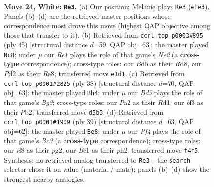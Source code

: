 \documentclass[11pt]{article}
\begin{document}
\clearpage

\begin{figure}[p]\centering
\begin{subfigure}{0.46\textwidth}\centering
\resizebox{\linewidth}{!}{%
\newchessgame
\chessboard[
  setfen={1r3r2/pp4k1/6pp/2pB3n/3bpP1P/N4bP1/PP1P4/1RB1RK2 w - - 1 24},
  showmover=false,
  pgfstyle=straightmove, color=movearrow, markmove={e1-e3}
]}
\caption{}
\end{subfigure}\hfill
\begin{subfigure}{0.46\textwidth}\centering
\resizebox{\linewidth}{!}{%
\newchessgame
\chessboard[
  setfen={3rr1k1/p3n1b1/1p3p1p/2pP1bp1/2P4P/R3B3/P2NBPP1/3K3R b - - 1 23},
  showmover=false,
  pgfstyle=straightmove, color=movearrow, markmove={e7-c8}
]}
\caption{}
\end{subfigure}
\\[4pt]
\begin{subfigure}{0.46\textwidth}\centering
\resizebox{\linewidth}{!}{%
\newchessgame
\chessboard[
  setfen={2r3k1/1b1r1pp1/pp1b1n1p/4p3/P3P1P1/2NB2BP/1PP1K3/R2R4 w - - 0 20},
  showmover=false,
  pgfstyle=straightmove, color=movearrow, markmove={g3-h4}
]}
\caption{}
\end{subfigure}\hfill
\begin{subfigure}{0.46\textwidth}\centering
\resizebox{\linewidth}{!}{%
\newchessgame
\chessboard[
  setfen={rn1r1k2/pp3pp1/1bb1p1p1/4N3/3P4/PB2B3/1P3PPP/2RR2K1 b - - 9 20},
  showmover=false,
  pgfstyle=straightmove, color=movearrow, markmove={c6-e8}
]}
\caption{}
\end{subfigure}
\caption{\textbf{Move 24, White: \texttt{Re3}.} (a) Our position; Melanie plays \texttt{Re3} (\texttt{e1e3}). Panels (b)--(d) are the retrieved master positions whose correspondence most drove this move (highest QAP objective among those that transfer to it). (b) Retrieved from \texttt{ccrl\_top\_p0003\#895} (ply 45) [structural distance $d$=59, QAP obj=63]: the master played \texttt{Nc8}; under $\mu$ our \emph{Re1} plays the role of that game's \emph{Ne2} (a \textbf{cross-type} correspondence); cross-type roles: our \emph{B}d5 as their \emph{R}d8, our \emph{P}d2 as their \emph{R}e8; transferred move \texttt{e1d1}. (c) Retrieved from \texttt{ccrl\_top\_p0001\#2825} (ply 38) [structural distance $d$=70, QAP obj=63]: the master played \texttt{Bh4}; under $\mu$ our \emph{Bd5} plays the role of that game's \emph{Bg3}; cross-type roles: our \emph{P}a2 as their \emph{R}d1, our \emph{b}f3 as their \emph{P}b2; transferred move \texttt{d5b3}. (d) Retrieved from \texttt{ccrl\_top\_p0001\#1909} (ply 39) [structural distance $d$=63, QAP obj=62]: the master played \texttt{Be8}; under $\mu$ our \emph{Pf4} plays the role of that game's \emph{Bc3} (a \textbf{cross-type} correspondence); cross-type roles: our \emph{r}f8 as their \emph{p}g2, our \emph{B}c1 as their \emph{p}h2; transferred move \texttt{f4f5}. Synthesis: no retrieved analog transferred to \texttt{Re3} -- the \texttt{search} selector chose it on value (material / mate); panels (b)--(d) show the strongest nearby analogies.}
\label{fig:thought-m46}
\end{figure}
\end{document}
